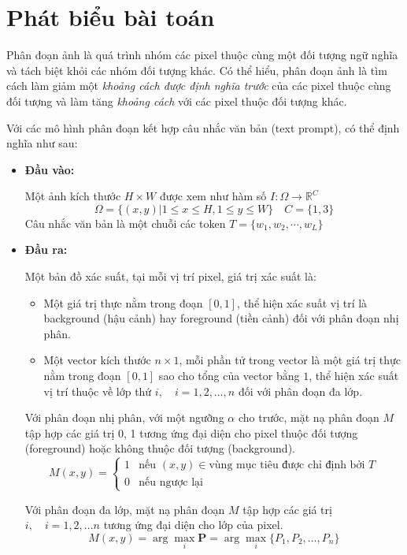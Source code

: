 \chapter{Phát biểu bài toán}
\label{Chapter1}
\setcounter{secnumdepth}{5}

Phân đoạn ảnh là quá trình nhóm các pixel thuộc cùng một đối tượng ngữ nghĩa và tách biệt khỏi các nhóm đối tượng khác. Có thể hiểu, phân đoạn ảnh là tìm cách làm giảm một \textit{khoảng cách được định nghĩa trước} của các pixel thuộc cùng đối tượng và làm tăng \textit{khoảng cách} với các pixel thuộc đối tượng khác.

Với các mô hình phân đoạn kết hợp câu nhắc văn bản (text prompt), có thể định nghĩa như sau:

\begin{itemize}
    \item \textbf{Đầu vào:}

    Một ảnh kích thước $H \times W$ được xem như hàm số $I: \Omega \rightarrow \mathbb{R}^C$ \\
    \[
        \Omega = \{(x, y) | 1 \le x \le H, 1 \le y \le W\} \quad C=\{1, 3\}
    \]
    Câu nhắc văn bản là một chuỗi các token $T=\{w_1, w_2, \cdots, w_L\}$

    \item \textbf{Đầu ra:}

    Một bản đồ xác suất, tại mỗi vị trí pixel, giá trị xác suất là:
        \begin{itemize}
            \item Một giá trị thực nằm trong đoạn $[0, 1]$, thể hiện xác suất vị trí là background (hậu cảnh) hay foreground (tiền cảnh) đối với phân đoạn nhị phân.
            \item Một vector kích thước $n \times 1$, mỗi phần tử trong vector là một giá trị thực nằm trong đoạn $[0, 1]$ sao cho tổng của vector bằng $1$, thể hiện xác suất vị trí thuộc về lớp thứ $i, \quad i = 1, 2, \dots, n$ đối với phân đoạn đa lớp.
        \end{itemize}

    Với phân đoạn nhị phân, với một ngưỡng $\alpha$ cho trước, mặt nạ phân đoạn $M$ tập hợp các giá trị 0, 1 tương ứng đại diện cho pixel thuộc đối tượng (foreground) hoặc không thuộc đối tượng (background).
    \[
    M(x, y) =
        \begin{cases}
        1 & \text{nếu } (x, y) \in \text{vùng mục tiêu được chỉ định bởi } T \\
        0 & \text{nếu ngược lại}
        \end{cases}
    \]

    Với phân đoạn đa lớp, mặt nạ phân đoạn $M$ tập hợp các giá trị $i, \quad i = 1, 2, \dots n$ tương ứng đại diện cho lớp của pixel.
    \[
    M(x, y) = \arg\max_{i} \mathbf{P} = \arg\max_i \{P_1, P_2, \dots, P_n\}
    \]
\end{itemize}

